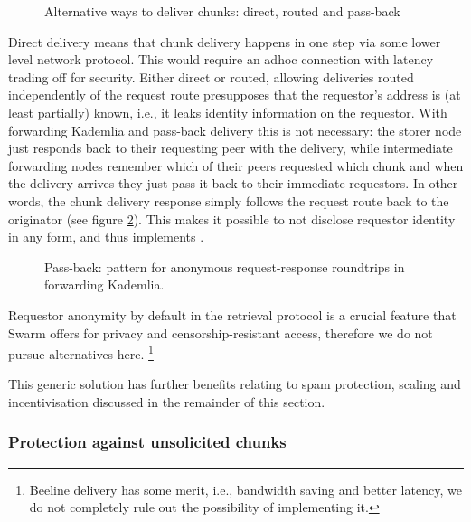 \begin{figure}[htbp]
   \centering
   \caption[Alternative ways to deliver chunks: direct, routed and pass-back]{Alternative ways to deliver chunks: direct, routed and pass-back}
   \label{fig:chunk-delivery}
\end{figure}

Direct delivery means that chunk delivery happens in one step via some lower level network protocol. This would require an adhoc connection with latency trading off for security. Either direct or routed, allowing deliveries routed independently of the request route presupposes that the requestor's address is (at least partially) known, i.e., it leaks identity information on the requestor. With forwarding Kademlia and pass-back delivery this is not necessary: the storer node just responds back to their requesting peer with the delivery, while intermediate forwarding nodes remember which of their peers requested which chunk and when the delivery arrives they just pass it back to their immediate requestors. In other words, the chunk delivery response simply follows the request route back to the originator (see figure \ref{fig:request-response}). This makes it possible to not disclose requestor identity in any form, and thus implements . 

\begin{figure}[htbp]
   \centering
   \caption[Pass-back: pattern for anonymous request-response roundtrips in forwarding Kademlia]{Pass-back: pattern for anonymous request-response roundtrips in forwarding Kademlia.}
   \label{fig:request-response}
\end{figure}

Requestor anonymity by default in the retrieval protocol is a crucial feature that Swarm offers for privacy and censorship-resistant access, therefore we do not pursue alternatives here.%
%
\footnote{Beeline delivery has some merit, i.e., bandwidth saving and better latency, we do not completely rule out the possibility of implementing it. 
}


This generic solution has further benefits relating to spam protection, scaling and incentivisation discussed in the remainder of this  section.

\subsubsection{Protection against unsolicited chunks}

